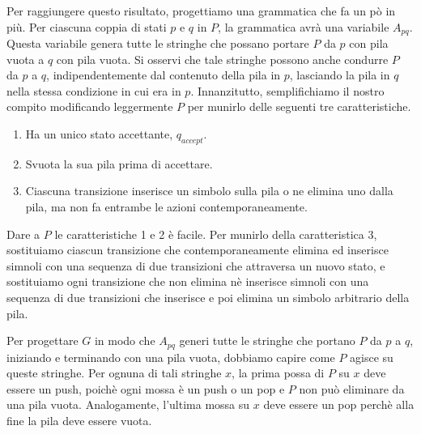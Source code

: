 \documentclass[12pt]{report}
\begin{document}
Per raggiungere questo risultato, progettiamo una grammatica che fa un pò in più. Per ciascuna coppia di stati $p$ e $q$ in $P$, la grammatica avrà una variabile $A_{pq}$. Questa variabile genera tutte le stringhe che possano portare $P$ da $p$ con pila vuota a $q$ con pila vuota. Si osservi che tale stringhe possono anche condurre $P$ da $p$ a $q$, indipendentemente dal contenuto della pila in $p$, lasciando la pila in $q$ nella stessa condizione in cui era in $p$.
Innanzitutto, semplifichiamo il nostro compito modificando leggermente $P$ per munirlo delle seguenti tre caratteristiche.
\begin{enumerate}
	\item Ha un unico stato accettante, $q_{accept}$.
	\item Svuota la sua pila prima di accettare.
	\item Ciascuna transizione inserisce un simbolo sulla pila o ne elimina uno dalla pila, ma non fa entrambe le azioni contemporaneamente.
\end{enumerate}
Dare a $P$ le caratteristiche 1 e 2 è facile. Per munirlo della caratteristica 3, sostituiamo ciascun transizione che contemporaneamente elimina ed inserisce simnoli con una sequenza di due transizioni che attraversa un nuovo stato, e sostituiamo ogni transizione che non elimina nè inserisce simnoli con una sequenza di due transizioni che inserisce e poi elimina un simbolo arbitrario della pila.

Per progettare $G$ in modo che $A_{pq}$ generi tutte le stringhe che portano $P$ da $p$ a $q$, iniziando e terminando con una pila vuota, dobbiamo capire come $P$ agisce su queste stringhe. Per ognuna di tali stringhe $x$, la prima possa di $P$ su $x$ deve essere un push, poichè ogni mossa è un push o un pop e $P$ non può eliminare da una pila vuota. Analogamente, l'ultima mossa su $x$ deve essere un pop perchè alla fine la pila deve essere vuota.
\end{document}
